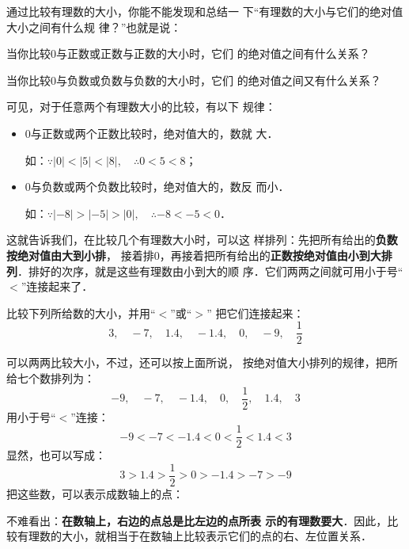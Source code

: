 通过比较有理数的大小，你能不能发现和总结一
下“有理数的大小与它们的绝对值大小之间有什么规
律？”也就是说：

    当你比较0与正数或正数与正数的大小时，它们
的绝对值之间有什么关系？

    当你比较0与负数或负数与负数的大小时，它们
的绝对值之间又有什么关系？

    可见，对于任意两个有理数大小的比较，有以下
规律：
\begin{itemize}
    \item 0与正数或两个正数比较时，绝对值大的，数就
大．

如：$\because |0|<|5|<|8|, \quad \therefore 0<5<8$；
\item 0与负数或两个负数比较时，绝对值大的，数反
而小．

如：$\because |-8|>|-5|>|0|, \quad \therefore -8<-5<0$．
\end{itemize}
    
  这就告诉我们，在比较几个有理数大小时，可以这
样排列：先把所有给出的\textbf{负数按绝对值由大到小排}，
接着排0，再接着把所有给出的\textbf{正数按绝对值由小到大排
列}．排好的次序，就是这些有理数由小到大的顺
序．它们两两之间就可用小于号“$<$”连接起来了．

\begin{example}
 比较下列所给数的大小，并用“$<$”或“$>$”
把它们连接起来：   
\[3,\quad -7,\quad 1.4,\quad -1.4,\quad 0,\quad -9,\quad \frac{1}{2} \]
\end{example}

\begin{solution}
 可以两两比较大小，不过，还可以按上面所说，
    按绝对值大小排列的规律，把所给七个数排列为：
\[-9,\quad -7,\quad -1.4,\quad 0,\quad \frac{1}{2},\quad 1.4,\quad 3  \]
用小于号“$<$”连接：
\[-9<-7<-1.4<0< \frac{1}{2}< 1.4<3  \]
显然，也可以写成：
\[3>1.4>\frac{1}{2}>0>-1.4>-7>-9 \]
把这些数，可以表示成数轴上的点：
\begin{figure}[htp]
    \centering
    \caption{}
\end{figure}
\end{solution}

不难看出：\textbf{在数轴上，右边的点总是比左边的点所表
示的有理数要大}．因此，比较有理数的大小，就相当于在数轴上比较表示它们的点的右、左位置关系．

